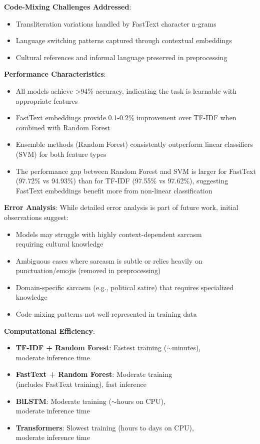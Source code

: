 \documentclass[11pt]{article}
\begin{document}
\textbf{Code-Mixing Challenges Addressed}:
\begin{itemize}
\item Transliteration variations handled by FastText character n-grams
\item Language switching patterns captured through contextual embeddings
\item Cultural references and informal language preserved in preprocessing
\end{itemize}

\textbf{Performance Characteristics}:
\begin{itemize}
\item All models achieve >94\% accuracy, indicating the task is learnable with appropriate features
\item FastText embeddings provide 0.1-0.2\% improvement over TF-IDF when combined with Random Forest
\item Ensemble methods (Random Forest) consistently outperform linear classifiers (SVM) for both feature types
\item The performance gap between Random Forest and SVM is larger for FastText (97.72\% vs 94.93\%) than for TF-IDF (97.55\% vs 97.62\%), suggesting FastText embeddings benefit more from non-linear classification
\end{itemize}

\textbf{Error Analysis}:
While detailed error analysis is part of future work, initial observations suggest:
\begin{itemize}
\item Models may struggle with highly context-dependent sarcasm\\ requiring cultural knowledge
\item Ambiguous cases where sarcasm is subtle or relies heavily on punctuation/emojis (removed in preprocessing)
\item Domain-specific sarcasm (e.g., political satire) that requires specialized knowledge
\item Code-mixing patterns not well-represented in training data
\end{itemize}

\textbf{Computational Efficiency}:
\begin{itemize}
\item \textbf{TF-IDF + Random Forest}: Fastest training ($\sim$minutes),\\ moderate inference time
\item \textbf{FastText + Random Forest}: Moderate training\\ (includes FastText training), fast inference
\item \textbf{BiLSTM}: Moderate training ($\sim$hours on CPU),\\ moderate inference time
\item \textbf{Transformers}: Slowest training (hours to days on CPU),\\ moderate inference time
\end{itemize}
\end{document}
